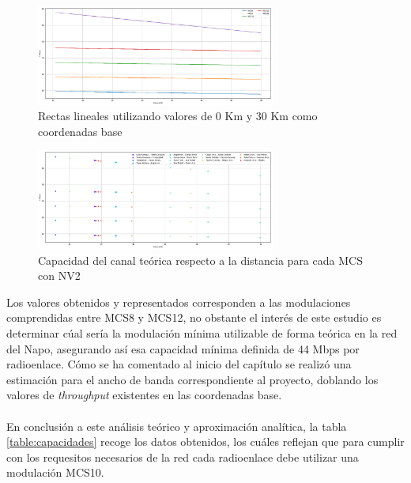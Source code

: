 	\begin{figure}[H]
		\centering
		\includegraphics[width=0.7\textwidth]{img/rectas.png}
		\caption{Rectas lineales utilizando valores de 0 Km y 30 Km como coordenadas base}
		\label{rectaspendiente}
	\end{figure}
	
	\begin{figure}[H]
		\centering
		\includegraphics[width=0.7\textwidth]{img/valoresmbps.png}
		\caption{Capacidad del canal teórica respecto a la distancia para cada MCS con NV2}
		\label{valoresmbps}
	\end{figure}
	
	Los valores obtenidos y representados corresponden a las modulaciones comprendidas entre MCS8 y MCS12, no obstante el interés de este estudio es determinar cúal sería la modulación mínima utilizable de forma teórica en la red del Napo, asegurando así esa capacidad mínima definida de 44 Mbps por radioenlace. Cómo se ha comentado al inicio del capítulo se realizó una estimación para el ancho de banda correspondiente al proyecto, doblando los valores de \textit{throughput} existentes en las coordenadas base.\\\\
	
	En conclusión a este análisis teórico y aproximación analítica, la tabla \ref{table:capacidades} recoge los datos obtenidos, los cuáles reflejan que para cumplir con los requesitos necesarios de la red cada radioenlace debe utilizar una modulación MCS10.   
	
